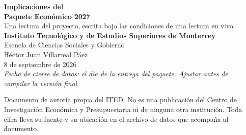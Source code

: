\thispagestyle{empty}
\begin{center}
\vspace*{3.2cm}
{\Huge\bfseries Implicaciones del\\[6pt] Paquete Económico 2027}\\[1.4cm]
{\large Una lectura del proyecto, escrita bajo las condiciones de una lectura en vivo}\\[2.6cm]
{\large\bfseries Instituto Tecnológico y de Estudios Superiores de Monterrey}\\[4pt]
{\large Escuela de Ciencias Sociales y Gobierno}\\[1.6cm]
{\large Héctor Juan Villarreal Páez}\\[2.4cm]
{\large 8 de septiembre de 2026}\\[4pt]
{\small\itshape Fecha de cierre de datos: el día de la entrega del paquete. Ajustar antes de compilar la versión final.}
\end{center}
\vfill
\begin{center}\small
Documento de autoría propia del ITED. No es una publicación del Centro de Investigación
Económica y Presupuestaria ni de ninguna otra institución. Toda cifra lleva su fuente y su
ubicación en el archivo de datos que acompaña al documento.
\end{center}
\clearpage
